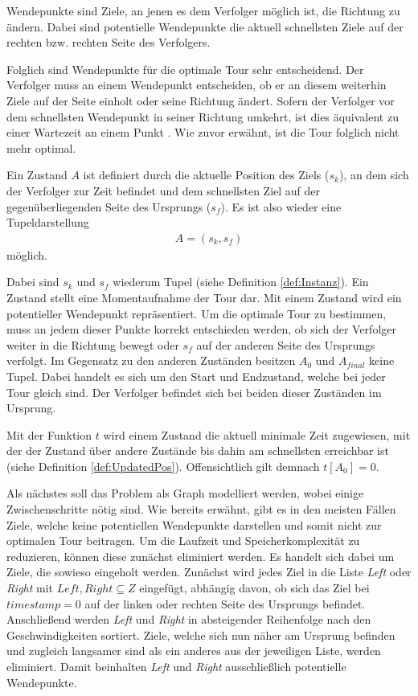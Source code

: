 \documentclass[german,version-2019-11]{uzl-thesis}
\begin{document}
\begin{definition}
Wendepunkte sind Ziele, an jenen es dem Verfolger möglich ist, die Richtung zu ändern. Dabei sind potentielle Wendepunkte die aktuell  schnellsten Ziele auf der rechten bzw. rechten Seite des Verfolgers.
\end{definition}\noindent
Folglich sind Wendepunkte für die optimale Tour sehr entscheidend. Der Verfolger muss an einem Wendepunkt entscheiden, ob er an diesem weiterhin Ziele auf der Seite einholt oder seine Richtung ändert. Sofern der Verfolger vor dem schnellsten Wendepunkt in seiner Richtung umkehrt, ist dies äquivalent zu einer Wartezeit an einem Punkt \cite{helvig}. Wie zuvor erwähnt, ist die Tour folglich nicht mehr optimal. 
\begin{definition}
Ein Zustand $A$ ist definiert durch die aktuelle Position des Ziels ($s_k$), an dem sich der Verfolger zur Zeit befindet und dem schnellsten Ziel auf der gegenüberliegenden Seite des Ursprungs ($s_f$). Es ist also wieder eine Tupeldarstellung
\begin{align*}
A = (s_k, s_f)
\end{align*}
möglich.
\end{definition}\noindent
Dabei sind $s_k$ und $s_f$ wiederum Tupel (siehe Definition \ref{def:Instanz}). Ein Zustand stellt eine Momentaufnahme der Tour dar. Mit einem Zustand wird ein potentieller Wendepunkt repräsentiert. Um die optimale Tour zu bestimmen, muss an jedem dieser Punkte korrekt entschieden werden, ob sich der Verfolger weiter in die Richtung bewegt oder $s_f$ auf der anderen Seite des Ursprungs verfolgt. Im Gegensatz zu den anderen Zuständen besitzen $A_0$ und $A_{final}$ keine Tupel. Dabei handelt es sich um den Start und Endzustand, welche bei jeder Tour gleich sind. Der Verfolger befindet sich bei beiden dieser Zuständen im Ursprung. 

Mit der Funktion $t$ wird einem Zustand die aktuell minimale Zeit zugewiesen, mit der der Zustand über andere Zustände bis dahin am schnellsten erreichbar ist (siehe Definition \ref{def:UpdatedPos}). Offensichtlich gilt demnach $t[A_0] = 0$.

Als nächstes soll das Problem als Graph modelliert werden, wobei einige Zwischenschritte nötig sind. Wie bereits erwähnt, gibt es in den meisten Fällen Ziele, welche keine potentiellen Wendepunkte darstellen und somit nicht zur optimalen Tour beitragen. Um die Laufzeit und Speicherkomplexität zu reduzieren, können diese zunächst eliminiert werden. Es handelt sich dabei um Ziele, die sowieso eingeholt werden. Zunächst wird jedes Ziel in die Liste \emph{Left} oder \emph{Right} mit $Left, Right \subseteq Z$ eingefügt, abhängig davon, ob sich das Ziel bei $timestamp = 0$ auf der linken oder rechten Seite des Ursprungs befindet. Anschließend werden \emph{Left} und \emph{Right} in absteigender Reihenfolge nach den Geschwindigkeiten sortiert. Ziele, welche sich nun näher am Ursprung befinden und zugleich langsamer sind als ein anderes aus der jeweiligen Liste, werden eliminiert. Damit beinhalten \emph{Left} und \emph{Right} ausschließlich potentielle Wendepunkte. 
\end{document}
